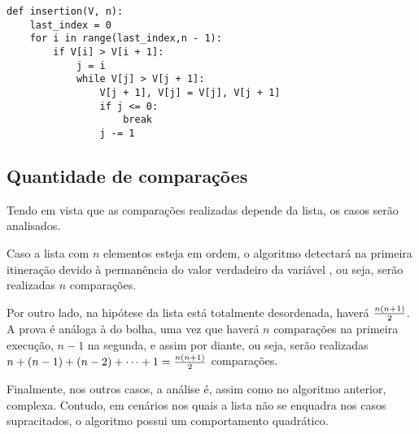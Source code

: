 \begin{lstlisting}
def insertion(V, n):
    last_index = 0
    for i in range(last_index,n - 1):
        if V[i] > V[i + 1]:
            j = i
            while V[j] > V[j + 1]:
                V[j + 1], V[j] = V[j], V[j + 1]
                if j <= 0:
                    break
                j -= 1
\end{lstlisting}

\subsection{Quantidade de comparações}
Tendo em vista que as comparações realizadas depende da lista, os casos serão analisados. 

Caso a lista com $n$ elementos esteja em ordem, o algoritmo detectará na primeira itineração devido à permanência do valor verdadeiro da variável , ou seja, serão realizadas $n$ comparações.

Por outro lado, na hipótese da lista está totalmente desordenada, haverá $n(n+1)\over 2$. A prova é análoga à do bolha, uma vez que haverá $n$ comparações na primeira execução, $n-1$ na segunda, e assim por diante, ou seja, serão realizadas $n + (n-1)+(n-2)+\cdots+1 = {n(n+1)\over 2}$ comparações.

Finalmente, nos outros casos, a análise é, assim como no algoritmo anterior, complexa. Contudo, em cenários nos quais a lista não se enquadra nos casos supracitados, o algoritmo possui um comportamento quadrático\cite{insertioncomplexity}.